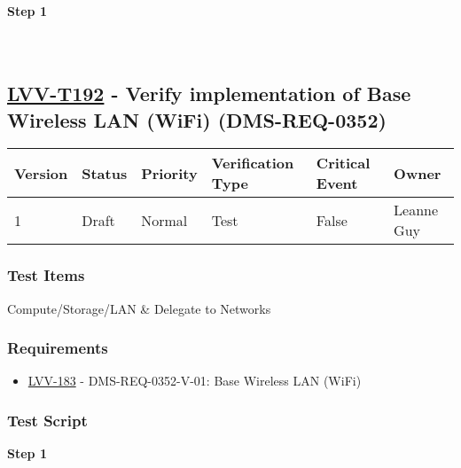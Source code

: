 \textbf{Step 1}\\
~\\
~\\

\hypertarget{lvv-t192---verify-implementation-of-base-wireless-lan-wifi-dms-req-0352}{%
\subsection{\texorpdfstring{\href{https://jira.lsstcorp.org/secure/Tests.jspa\#/testCase/LVV-T192}{LVV-T192}
- Verify implementation of Base Wireless LAN (WiFi)
(DMS-REQ-0352)}{LVV-T192 - Verify implementation of Base Wireless LAN (WiFi) (DMS-REQ-0352)}}\label{lvv-t192---verify-implementation-of-base-wireless-lan-wifi-dms-req-0352}}

\begin{longtable}[]{@{}llllll@{}}
\toprule
Version & Status & Priority & Verification Type & Critical Event &
Owner\tabularnewline
\midrule
\endhead
1 & Draft & Normal & Test & False & Leanne Guy\tabularnewline
\bottomrule
\end{longtable}

\hypertarget{test-items-168}{%
\subsubsection{Test Items}\label{test-items-168}}

Compute/Storage/LAN \& Delegate to Networks

\hypertarget{requirements-169}{%
\subsubsection{Requirements}\label{requirements-169}}

\begin{itemize}
\tightlist
\item
  \href{https://jira.lsstcorp.org/browse/LVV-183}{LVV-183} -
  DMS-REQ-0352-V-01: Base Wireless LAN (WiFi)
\end{itemize}

\hypertarget{test-script-169}{%
\subsubsection{Test Script}\label{test-script-169}}

\textbf{Step 1}\\
~\\
~\\

